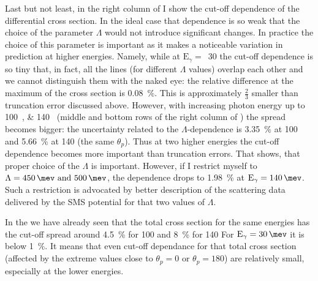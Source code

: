     Last but not least, in the right column of 
    I show the cut-off dependence of the differential cross section.
    In the ideal case that dependence is so weak that
    the choice of the parameter $\Lambda$ would not introduce significant 
    changes. In practice the choice of this parameter is 
    important as it makes a noticeable variation in prediction at higher energies.
    Namely, while at $\text{E}_\gamma=$~\SI{30}{\mev} the cut-off dependence is so tiny
    that, in fact, all the lines (for different $\Lambda$ values)
    overlap each other and we cannot distinguish them with the naked eye:
    the relative difference at the maximum of the cross section is \SI{0.08}{\percent}.
    This is approximately $\frac{2}{3}$ smaller than truncation error discussed above.
    However, with increasing photon energy up to \SIlist{100; 140}{\mev} 
    (middle and bottom rows of the right column of ) the spread becomes bigger:
    the  uncertainty related to the 
    $\Lambda$-dependence is  \SI{3.35}{\percent} at \SI{100}{\mev}
    and \SI{5.66}{\percent} at \SI{140}{\mev} (the same $\theta_p$).
    Thus at two higher energies the cut-off dependence becomes more important
    than truncation errors.
    That shows, that proper choice of the $\Lambda$ is important.
    However, if I restrict myself to $\Lambda=\SIlist{450;500}{\mev}$,
    the dependence drops to \SI{1.98}{\percent} at $\text{E}_\gamma=\SI{140}{\mev}$.
    Such a restriction is advocated by better description of the scattering data
    delivered by the SMS potential for that two values of $\Lambda$.

    In the  we have already seen that the total
    cross section for the same energies has the cut-off spread
    around \SI{4.5}{\percent} for \SI{100}{\mev} and \SI{8}{\percent} for \SI{140}{\mev}
     For $\text{E}_\gamma=\SI{30}{\mev}$ it is below  \SI{1}{\percent}.
     It means that even cut-off dependance for that total cross section (affected
     by the extreme values close to $\theta_p = 0$ or $\theta_p = 180$)  are
     relatively small, especially at the lower energies.



